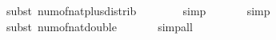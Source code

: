 \begin{isabellebody}
\ {\isacharparenleft}{\kern0pt}subst\ num{\isacharunderscore}{\kern0pt}of{\isacharunderscore}{\kern0pt}nat{\isacharunderscore}{\kern0pt}plus{\isacharunderscore}{\kern0pt}distrib{\isacharparenright}{\kern0pt}\isanewline
\ \ \ \ \ \ \isamarkupfalse%
\ simp\isanewline
\ \ \ \ \ \isamarkupfalse%
\ simp\isanewline
\ \ \ \ \isamarkupfalse%
\ {\isacharparenleft}{\kern0pt}subst\ num{\isacharunderscore}{\kern0pt}of{\isacharunderscore}{\kern0pt}nat{\isacharunderscore}{\kern0pt}double{\isacharparenright}{\kern0pt}\isanewline
\ \ \ \ \ \isamarkupfalse%
\ simp{\isacharunderscore}{\kern0pt}all\isanewline
\ \ \ \ \isamarkupfalse%
\isanewline
{}\isamarkupfalse%
%
\endisatagproof
{\isafoldproof}%
%
\isadelimproof
\isanewline
%
\endisadelimproof
\isanewline
{}\isamarkupfalse%
\isanewline
%
\isadelimtheory
\isanewline
%
\endisadelimtheory
%
\isatagtheory
{}\isamarkupfalse%
%
\endisatagtheory
{\isafoldtheory}%
%
\isadelimtheory
%
\endisadelimtheory
%
\end{isabellebody}%
\endinput
